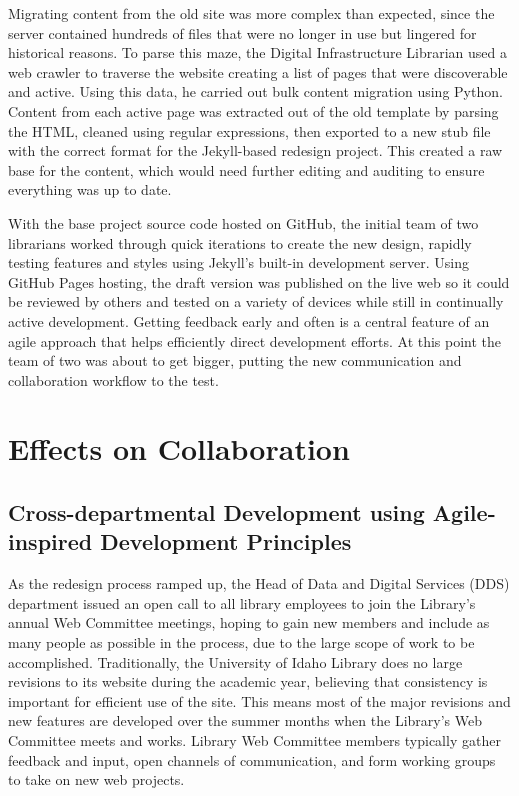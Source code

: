 \documentclass{book}
\begin{document}
Migrating content from the old site was more complex than expected, since the
server contained hundreds of files that were no longer in use but lingered for
historical reasons. To parse this maze, the Digital Infrastructure Librarian
used a web crawler to traverse the website creating a list of pages that were
discoverable and active. Using this data, he carried out bulk content
migration using Python. Content from each active page was extracted out of the
old template by parsing the HTML, cleaned using regular expressions, then
exported to a new stub file with the correct format for the Jekyll-based
redesign project. This created a raw base for the content, which would need
further editing and auditing to ensure everything was up to date.

With the base project source code hosted on GitHub, the initial team of two
librarians worked through quick iterations to create the new design, rapidly
testing features and styles using Jekyll's built-in development server. Using
GitHub Pages hosting, the draft version was published on the live web so it
could be reviewed by others and tested on a variety of devices while still in
continually active development. Getting feedback early and often is a central
feature of an agile approach that helps efficiently direct development
efforts. At this point the team of two was about to get bigger, putting the
new communication and collaboration workflow to the test.

\hypertarget{effects-on-collaboration}{%
\chapter{Effects on Collaboration}\label{effects-on-collaboration}}

\hypertarget{cross-departmental-development-using-agile-inspired-development-principles}{%
\section{Cross-departmental Development using Agile-inspired Development
Principles}\label{cross-departmental-development-using-agile-inspired-development-principles}}

As the redesign process ramped up, the Head of Data and Digital Services (DDS)
department issued an open call to all library employees to join the Library's
annual Web Committee meetings, hoping to gain new members and include as many
people as possible in the process, due to the large scope of work to be
accomplished. Traditionally, the University of Idaho Library does no large
revisions to its website during the academic year, believing that consistency
is important for efficient use of the site. This means most of the major
revisions and new features are developed over the summer months when the
Library's Web Committee meets and works. Library Web Committee members
typically gather feedback and input, open channels of communication, and form
working groups to take on new web projects.
\end{document}
